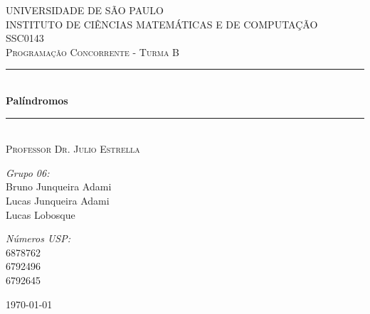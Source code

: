 \documentclass[a4paper]{article}
\newcommand{\HRule}{\rule{\linewidth}{0.5mm}}
\begin{document}
\begin{titlepage}
\begin{center}	

\textsc{\Large UNIVERSIDADE DE SÃO PAULO\\
	INSTITUTO DE CIÊNCIAS MATEMÁTICAS E DE COMPUTAÇÃO}\\[0.7cm]

\textsc{\Large SSC0143}\\[0.2cm]
\textsc{\Large Programação Concorrente - Turma B}\\[0.5cm]

\HRule \\[0.4cm]
{ \huge \bfseries Palíndromos}\\[0.4cm]
\HRule \\[0.4cm]
\textsc{Professor Dr. Julio Estrella}\\[1.5cm]

\begin{minipage}{0.4\textwidth}
\begin{flushleft} \large
\emph{Grupo 06:}\\
Bruno Junqueira Adami\\
Lucas Junqueira Adami\\
Lucas Lobosque\\
\end{flushleft}
\end{minipage}
\begin{minipage}{0.4\textwidth}
\begin{flushright} \large
\emph{Números USP:}\\
6878762\\
6792496\\
6792645\\
\end{flushright}
\end{minipage}

\vfill

{\large \today}
	
\end{center}
\end{titlepage}
\end{document}
